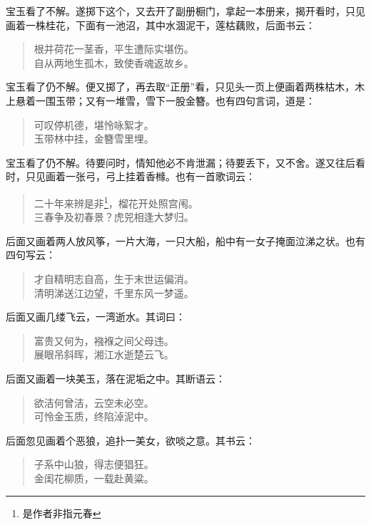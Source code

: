 \documentclass[12pt,oneside]{book}
\newenvironment{shici}{%
\begin{verse}%
\centering\large\hspace{12pt}}%
{\end{verse}}
\begin{document}
宝玉看了不解。遂掷下这个，又去开了副册橱门，拿起一本册来，揭开看时，只见画着一株桂花，下面有一池沼，其中水涸泥干，莲枯藕败，后面书云：

\begin{shici}
根并荷花一茎香，平生遭际实堪伤。\\
自从两地生孤木，致使香魂返故乡。
\end{shici}


宝玉看了仍不解。便又掷了，再去取“正册”看，只见头一页上便画着两株枯木，木上悬着一围玉带；又有一堆雪，雪下一股金簪。也有四句言词，道是：

\begin{shici}
可叹停机德，堪怜咏絮才。\\
玉带林中挂，金簪雪里埋。
\end{shici}

宝玉看了仍不解。待要问时，情知他必不肯泄漏；待要丢下，又不舍。遂又往后看时，只见画着一张弓，弓上挂着香橼。也有一首歌词云：

\begin{shici}
二十年来辨是非\footnote{是作者非指元春}，榴花开处照宫闱。\\
三春争及初春景？虎兕相逢大梦归。
\end{shici}


后面又画着两人放风筝，一片大海，一只大船，船中有一女子掩面泣涕之状。也有四句写云：

\begin{shici}
才自精明志自高，生于末世运偏消。\\
清明涕送江边望，千里东风一梦遥。
\end{shici}

后面又画几缕飞云，一湾逝水。其词曰：

\begin{shici}
富贵又何为，襁褓之间父母违。\\
展眼吊斜晖，湘江水逝楚云飞。
\end{shici}

后面又画着一块美玉，落在泥垢之中。其断语云：

\begin{shici}
欲洁何曾洁，云空未必空。\\
可怜金玉质，终陷淖泥中。
\end{shici}


后面忽见画着个恶狼，追扑一美女，欲啖之意。其书云：


\begin{shici}
子系中山狼，得志便猖狂。\\
金闺花柳质，一载赴黄粱。
\end{shici}
\end{document}
